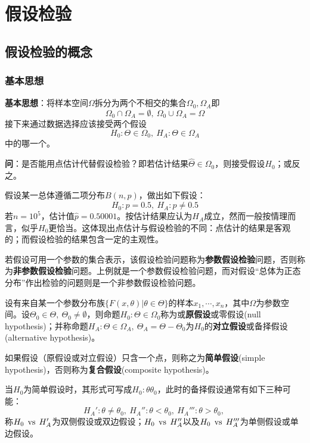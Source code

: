 \chapter{假设检验}

\section{假设检验的概念}

\subsection{基本思想}

\textbf{基本思想}：将样本空间$\Omega$拆分为两个不相交的集合$\Omega_0, \Omega_A$即
\[ \Omega_0 \cap \Omega_A=\emptyset,\ \Omega_0 \cup \Omega_A=\Omega \]
接下来通过数据选择应该接受两个假设
\[ H_0:\Theta \in \Omega_0,\ H_A:\Theta \in \Omega_A \]
中的哪一个。

\textbf{问}：是否能用点估计代替假设检验？即若估计结果$\hat{\Theta} \in \Omega_0$，则接受假设$H_0$；或反之。

假设某一总体遵循二项分布$B(n,p)$，做出如下假设：
\[ H_0:p=0.5,\ H_A : p \neq 0.5 \]
若$n=10^5$，估计值$\hat{p}=0.50001$。按估计结果应认为$H_A$成立，然而一般按情理而言，似乎$H_0$更恰当。这体现出点估计与假设检验的不同：点估计的结果是客观的；而假设检验的结果包含一定的主观性。

若假设可用一个参数的集合表示，该假设检验问题称为\textbf{参数假设检验}问题，否则称为\textbf{非参数假设检验}问题。上例就是一个参数假设检验问题，而对假设“总体为正态分布”作出检验的问题则是一个非参数假设检验问题。

\begin{definition}[原假设与对立假设]
    设有来自某一个参数分布族$\{ F(x,\theta) | \theta \in \Theta \}$的样本$x_1,\cdots ,x_n$，其中$\Omega$为参数空间。设$\Theta_0 \in \Theta,\ \Theta_0 \neq \emptyset$，则命题$ H_0:\Theta \in \Omega_0$称为或\textbf{原假设}或零假设(null hypothesis)；并称命题$H_A:\Theta \in \Omega_A,\ \Theta_A=\Theta-\Theta_0$为$H_0$的\textbf{对立假设}或备择假设(alternative hypothesis)。
\end{definition}

\begin{definition}
    如果假设（原假设或对立假设）只含一个点，则称之为\textbf{简单假设}(simple hypothesis)，否则称为\textbf{复合假设}(composite hypothesis)。
\end{definition}

当$H_0$为简单假设时，其形式可写成$H_0:\theta \theta_0$，此时的备择假设通常有如下三种可能：
\[ H_A':\theta \neq \theta_0,\ H_A'':\theta < \theta_0,\ H_A''':\theta > \theta_0,\ \]
称$H_0 \; \operatorname{vs}\; H_A'$为双侧假设或双边假设；$H_0 \; \operatorname{vs}\; H_A''$以及$H_0 \; \operatorname{vs}\; H_A'''$为单侧假设或单边假设。

